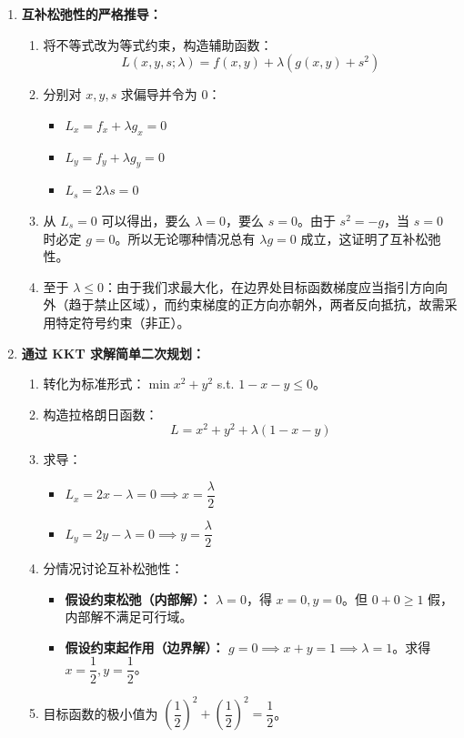 \documentclass[lang=cn,11pt]{elegantbook}
\begin{document}
\begin{solution}
\begin{enumerate}
  \item[(1)] \textbf{互补松弛性的严格推导：}
  \begin{enumerate}
    \item 将不等式改为等式约束，构造辅助函数：
    \[
    L(x,y,s;\lambda) = f(x,y) + \lambda(g(x,y) + s^2)
    \]
    \item 分别对 $x,y,s$ 求偏导并令为 0：
    \begin{itemize}
      \item $L_x = f_x + \lambda g_x = 0$
      \item $L_y = f_y + \lambda g_y = 0$
      \item $L_s = 2\lambda s = 0$
    \end{itemize}
    \item 从 $L_s=0$ 可以得出，要么 $\lambda=0$，要么 $s=0$。由于 $s^2 = -g$，当 $s=0$ 时必定 $g=0$。所以无论哪种情况总有 $\lambda g = 0$ 成立，这证明了互补松弛性。
    \item 至于 $\lambda \le 0$：由于我们求最大化，在边界处目标函数梯度应当指引方向向外（趋于禁止区域），而约束梯度的正方向亦朝外，两者反向抵抗，故需采用特定符号约束（非正）。
  \end{enumerate}

  \item[(2)] \textbf{通过 KKT 求解简单二次规划：}
  \begin{enumerate}
    \item 转化为标准形式：$\min x^2+y^2$ s.t. $1-x-y \le 0$。
    \item 构造拉格朗日函数：
    \[
    L = x^2+y^2 + \lambda(1-x-y)
    \]
    \item 求导：
    \begin{itemize}
      \item $L_x = 2x - \lambda = 0 \implies x=\dfrac{\lambda}{2}$
      \item $L_y = 2y - \lambda = 0 \implies y=\dfrac{\lambda}{2}$
    \end{itemize}
    \item 分情况讨论互补松弛性：
    \begin{itemize}
      \item \textbf{假设约束松弛（内部解）：} $\lambda=0$，得 $x=0,y=0$。但 $0+0 \ge 1$ 假，内部解不满足可行域。
      \item \textbf{假设约束起作用（边界解）：} $g=0 \implies x+y=1 \implies \lambda=1$。求得 $x=\dfrac{1}{2}, y=\dfrac{1}{2}$。
    \end{itemize}
    \item 目标函数的极小值为 $\left(\dfrac{1}{2}\right)^2+\left(\dfrac{1}{2}\right)^2 = \dfrac{1}{2}$。
  \end{enumerate}


\end{enumerate}
\end{solution}
\end{document}
